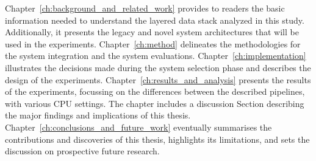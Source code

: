 Chapter~\ref{ch:background_and_related_work} provides to readers the basic information needed to understand the layered data stack analyzed in this study. Additionally, it presents the legacy and novel system architectures that will be used in the experiments. Chapter~\ref{ch:method} delineates the methodologies for the system integration and the system evaluations. Chapter~\ref{ch:implementation} illustrates the decisions made during the system selection phase and describes the design of the experiments. Chapter~\ref{ch:results_and_analysis} presents the results of the experiments, focussing on the differences between the described pipelines, with various \gls{CPU} settings. The chapter includes a discussion Section describing the major findings and implications of this thesis. Chapter~\ref{ch:conclusions_and_future_work} eventually summarises the contributions and discoveries of this thesis, highlights its limitations, and sets the discussion on prospective future research.